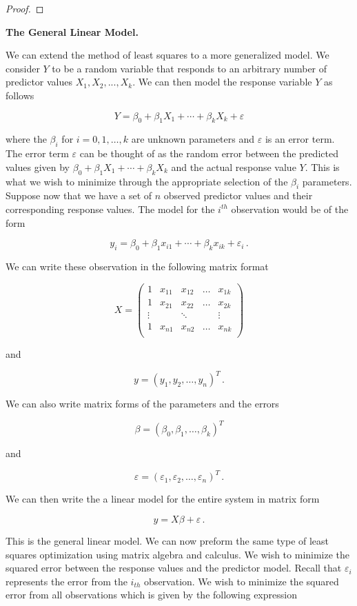 \documentclass[a4paper]{article}
\numberwithin{equation}{section}
\begin{document}
\begin{description}
\begin{proof}
\end{proof}

\item \textbf{The General Linear Model.}

We can extend the method of least squares to a more generalized model. We consider $Y$ to be a random variable that responds to an arbitrary number of predictor values $X_1, X_2,...,X_k$. We can then model the response variable $Y$ as follows

$$Y = \beta_0 + \beta_1X_1 + \cdots + \beta_kX_k + \varepsilon$$

where the $\beta_i$ for $i = 0,1,\dots,k$ are unknown parameters and $\varepsilon$ is an error term. The error term $\varepsilon$ can be thought of as the random error between the predicted values given by $\beta_0 + \beta_1X_1 + \cdots + \beta_kX_k$ and the actual response value $Y$. This is what we wish to minimize through the appropriate selection of the $\beta_i$ parameters.
	Suppose now that we have a set of $n$ observed predictor values and their corresponding response values. The model for the $i^{th}$ observation would be of the form
	
	$$y_i = \beta_0 + \beta_1x_{i1} + \cdots + \beta_kx_{ik} + \varepsilon_i\,.$$
	
	 We can write these observation in the following matrix format
	
	$$X = \begin{pmatrix}
		1 & x_{11} & x_{12} & \dots & x_{1k}\\
		1 & x_{21} & x_{22} & \dots & x_{2k}\\
		\vdots &  & \ddots &  & \vdots\\
		1 & x_{n1} & x_{n2} & \dots & x_{nk}\\
	\end{pmatrix}$$

and	
	
	$$y = (y_1, y_2, \dots, y_n)^T\,.$$
	
We can also write matrix forms of the parameters and the errors

	$$\beta = (\beta_0, \beta_1, \dots,\beta_k)^T$$

and
	
	$$\varepsilon = (\varepsilon_1,\varepsilon_2,\dots,\varepsilon_n)^T\,.$$
	
We can then write the a linear model for the entire system in matrix form

$$y = X\beta + \varepsilon\,.$$

This is the general linear model. We can now preform the same type of least squares optimization using matrix algebra and calculus. We wish to minimize the squared error between the response values and the predictor model. Recall that $\varepsilon_i$ represents the error from the $i_{th}$ observation. We wish to minimize the squared error from all observations which is given by the following expression


\end{description}
\end{document}
